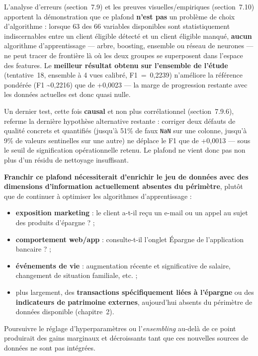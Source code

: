 \documentclass[11pt,a4paper]{report}
\begin{document}
L'analyse d'erreurs (section~7.9) et les preuves visuelles/empiriques
(section~7.10) apportent la démonstration que ce plafond \textbf{n'est
pas} un problème de choix d'algorithme : lorsque 63 des 66 variables
disponibles sont statistiquement indiscernables entre un client éligible
détecté et un client éligible manqué, \textbf{aucun} algorithme
d'apprentissage — arbre, boosting, ensemble ou réseau de neurones — ne
peut tracer de frontière là où les deux groupes se superposent dans
l'espace des features. Le \textbf{meilleur résultat obtenu sur l'ensemble
de l'étude} (tentative~18, ensemble à 4 vues calibré, F1~=~0,2239)
n'améliore la référence pondérée (F1 \textasciitilde 0,2216) que de
+0,0023 — la marge de progression restante avec les données actuelles est
donc quasi nulle.

Un dernier test, cette fois \textbf{causal} et non plus corrélationnel
(section~7.9.6), referme la dernière hypothèse alternative restante :
corriger deux défauts de qualité concrets et quantifiés (jusqu'à 51\% de
faux \texttt{NaN} sur une colonne, jusqu'à 9\% de valeurs sentinelles sur
une autre) ne déplace le F1 que de +0,0013 — sous le seuil de
signification opérationnelle retenu. Le plafond ne vient donc pas non
plus d'un résidu de nettoyage insuffisant.

\textbf{Franchir ce plafond nécessiterait d'enrichir le jeu de données
avec des dimensions d'information actuellement absentes du périmètre},
plutôt que de continuer à optimiser les algorithmes d'apprentissage :
\begin{itemize}
  \item \textbf{exposition marketing} : le client a-t-il reçu un e-mail
  ou un appel au sujet des produits d'épargne ? ;
  \item \textbf{comportement web/app} : consulte-t-il l'onglet
  \og Épargne \fg{} de l'application bancaire ? ;
  \item \textbf{événements de vie} : augmentation récente et
  significative de salaire, changement de situation familiale, etc. ;
  \item plus largement, des \textbf{transactions spécifiquement liées à
  l'épargne} ou des \textbf{indicateurs de patrimoine externes},
  aujourd'hui absents du périmètre de données disponible (chapitre~2).
\end{itemize}
Poursuivre le réglage d'hyperparamètres ou l'\textit{ensembling} au-delà
de ce point produirait des gains marginaux et décroissants tant que ces
nouvelles sources de données ne sont pas intégrées.
\end{document}
